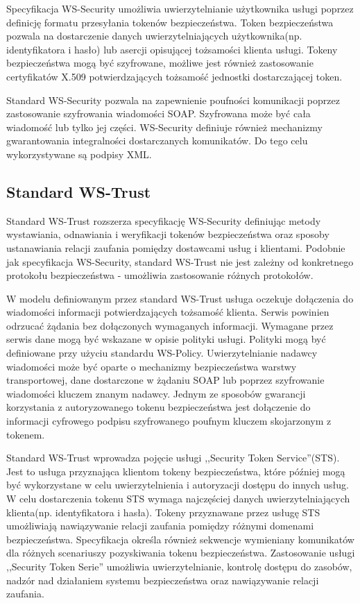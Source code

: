 		Specyfikacja WS-Security umożliwia uwierzytelnianie użytkownika usługi poprzez definicję formatu przesyłania tokenów bezpieczeństwa. Token bezpieczeństwa pozwala na dostarczenie danych uwierzytelniających użytkownika(np. identyfikatora i hasło) lub asercji opisującej tożsamości klienta usługi. Tokeny bezpieczeństwa mogą być szyfrowane, możliwe jest również zastosowanie certyfikatów X.509 potwierdzających tożsamość jednostki dostarczającej token. 

		Standard WS-Security pozwala na zapewnienie poufności komunikacji poprzez zastosowanie szyfrowania wiadomości SOAP. Szyfrowana może być cała wiadomość lub tylko jej części. WS-Security definiuje również mechanizmy gwarantowania integralności dostarczanych komunikatów. Do tego celu wykorzystywane są podpisy XML. 

	\subsection{Standard WS-Trust}

		Standard WS-Trust rozszerza specyfikację WS-Security definiując metody wystawiania, odnawiania i weryfikacji tokenów bezpieczeństwa oraz sposoby ustanawiania relacji zaufania pomiędzy dostawcami usług i klientami. Podobnie jak specyfikacja WS-Security, standard WS-Trust nie jest zależny od konkretnego protokołu bezpieczeństwa - umożliwia zastosowanie różnych protokołów\cite{WS-Trust-1.4-with-errata}.

		W modelu definiowanym przez standard WS-Trust usługa oczekuje dołączenia do wiadomości informacji potwierdzających tożsamość klienta. Serwis powinien odrzucać żądania bez dołączonych wymaganych informacji. Wymagane przez serwis dane mogą być wskazane w opisie polityki usługi. Polityki mogą być definiowane przy użyciu standardu WS-Policy. Uwierzytelnianie nadawcy wiadomości może być oparte o mechanizmy bezpieczeństwa warstwy transportowej, dane dostarczone w żądaniu SOAP lub poprzez szyfrowanie wiadomości kluczem znanym nadawcy. Jednym ze sposobów gwarancji korzystania z autoryzowanego tokenu bezpieczeństwa jest dołączenie do informacji cyfrowego podpisu szyfrowanego poufnym kluczem skojarzonym z tokenem.

		Standard WS-Trust wprowadza pojęcie usługi ,,Security Token Service''(STS). Jest to usługa przyznająca klientom tokeny bezpieczeństwa, które później mogą być wykorzystane w celu uwierzytelnienia i autoryzacji dostępu do innych usług. W celu dostarczenia tokenu STS wymaga najczęściej danych uwierzytelniających klienta(np. identyfikatora i hasła). Tokeny przyznawane przez usługę STS umożliwiają nawiązywanie relacji zaufania pomiędzy różnymi domenami bezpieczeństwa. Specyfikacja określa również sekwencje wymieniany komunikatów dla różnych scenariuszy pozyskiwania tokenu bezpieczeństwa. Zastosowanie usługi ,,Security Token Serie'' umożliwia uwierzytelnianie, kontrolę dostępu do zasobów, nadzór nad działaniem systemu bezpieczeństwa oraz nawiązywanie relacji zaufania.


